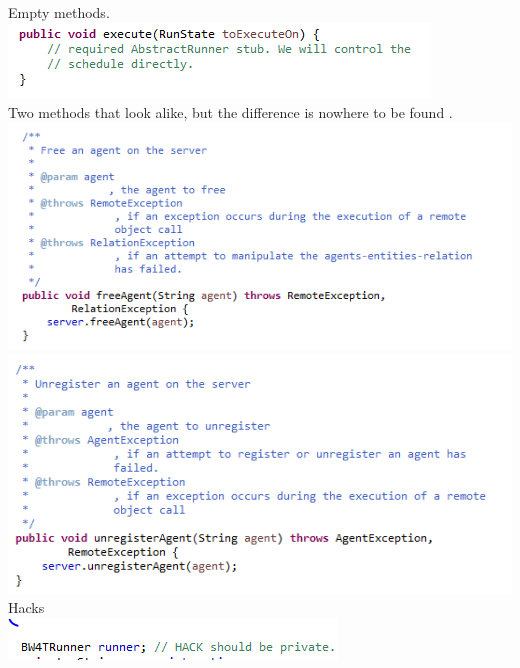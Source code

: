 Empty methods.\\
\includegraphics[width=\linewidth]{Transferability/emptyMethod.PNG} \\ 

Two methods that look alike, but the difference is nowhere to be found .\\
\includegraphics[width=\linewidth]{Transferability/freeAgentNoClue.PNG}
\includegraphics[width=\linewidth]{Transferability/unregisterAgentNoClue.PNG} \\ 

Hacks \\
\includegraphics[width=\linewidth]{Transferability/HackWTF.PNG} \\ 

